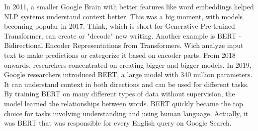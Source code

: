 In 2011, a smaller Google Brain with better features like word embeddings helped NLP systems understand context better. This was a big moment, with models becoming popular in 2017. Think, which is short for Generative Pre-trained Transformer, can create or "decode" new writing. Another example is BERT - Bidirectional Encoder Representations from Transformers. Wich analyze input text to make predictions or categorize it based on encoder parts.
\vskip 0.5cm
From 2018 onwards, researchers concentrated on creating bigger and bigger models. In 2019, Google researchers introduced BERT, a large model with 340 million parameters. It can understand context in both directions and can be used for different tasks. By training BERT on many different types of data without supervision, the model learned the relationships between words. BERT quickly became the top choice for tasks involving understanding and using human language. Actually, it was BERT that was responsible for every English query on Google Search.
